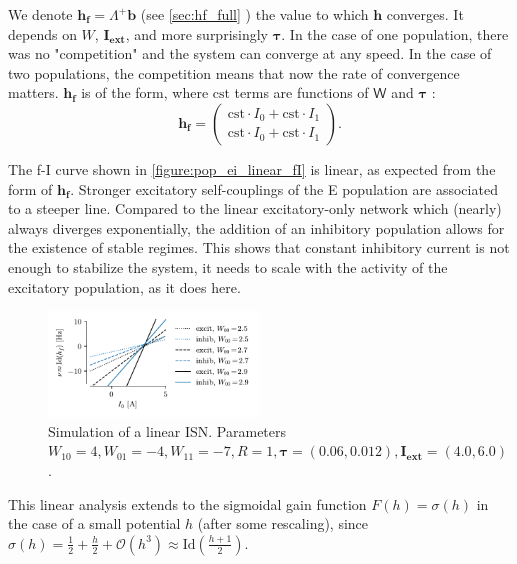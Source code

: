 \documentclass[10pt,conference,compsocconf,a4paper]{IEEEtran}
\renewcommand{\vec}[1]{\boldsymbol{#1}}
\newcommand*{\shortautoref}[1]{%
	\begingroup
	\def\equationautorefname{\textsc{Eq.}}%
	\def\tableautorefname{\textsc{Tab.}}%
	\def\figureautorefname{\textsc{Fig.}}%
	\autoref{#1}%
	\endgroup
}
\begin{document}
		We denote $\vec{h_f} = \Lambda^+ \vec{b}$ (see \shortautoref{sec:hf_full}) the value to which $\vec{h}$ converges. It depends on $W$, $\vec{I_{\text{ext}}}$, and more surprisingly $\vec \tau$. In the case of one population, there was no "competition" and the system can converge at any speed. In the case of two populations, the competition means that now the rate of convergence matters. $\vec{h_f}$ is of the form, where $\text{cst}$ terms are functions of $\mathsf W$ and $\vec \tau$ :
\
		\begin{equation*}
			\vec{h_f} = \begin{pmatrix}
				\text{cst} \cdot I_0 + \text{cst} \cdot I_1 \\
				\text{cst} \cdot I_0 + \text{cst} \cdot I_1
			\end{pmatrix}.
		\end{equation*}

		The f-I curve shown in \shortautoref{figure:pop_ei_linear_fI} is linear, as expected from the form of $\vec{h_f}$. Stronger excitatory self-couplings of the E population are associated to a steeper line.
		Compared to the linear excitatory-only network which (nearly) always diverges exponentially, the addition of an inhibitory population allows for the existence of stable regimes.
		This shows that constant inhibitory current is not enough to stabilize the system, it needs to scale with the activity of the excitatory population, as it does here.

		\begin{figure}
			\centering
			\includegraphics[width=0.5\textwidth]{figures/pop_ei_linear_fI.pdf}
			\caption{Simulation of a linear ISN. Parameters $W_{10} = 4, W_{01} = -4, W_{11} = -7, R = 1, \vec \tau = (0.06, 0.012), \vec{I_{\text{ext}}} = (4.0, 6.0)$.}
			\label{figure:pop_ei_linear_fI}
		\end{figure}

		This linear analysis extends to the sigmoidal gain function $F(h) = \sigma(h)$ in the case of a small potential $h$ (after some rescaling), since $\sigma(h) = \frac 12 + \frac h2 + \mathcal{O}(h^3) \approx \text{Id}(\frac {h+1}{2})$.

		
\end{document}
